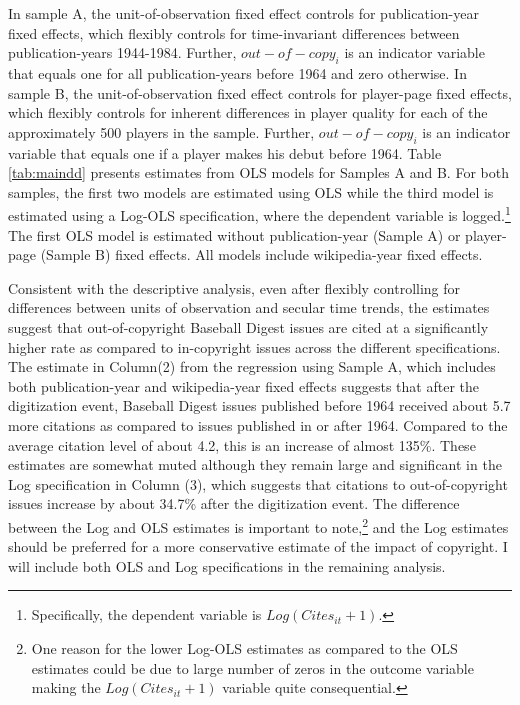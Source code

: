 \documentclass[11pt]{article}
\begin{document}
In sample A, the unit-of-observation fixed effect controls for publication-year fixed effects, which flexibly controls for time-invariant differences between publication-years 1944-1984. Further, $out-of-copy_i$ is an indicator variable that equals one for all publication-years before 1964 and zero otherwise. In sample B, the unit-of-observation fixed effect controls for player-page fixed effects, which flexibly controls  for inherent differences in player quality for each of the approximately 500 players in the sample. Further, $out-of-copy_i$ is an indicator variable that equals one if a player makes his debut before 1964. Table \ref{tab:maindd} presents estimates from OLS models for Samples A and B. For both samples, the first two models are estimated using OLS while the third model is estimated using a Log-OLS specification, where the dependent variable is logged.\footnote{Specifically, the dependent variable is $Log(Cites_{it}+1)$.} The first OLS model is estimated without publication-year (Sample A) or player-page (Sample B) fixed effects. All models include wikipedia-year fixed effects.

Consistent with the descriptive analysis, even after flexibly controlling for differences between units of observation and secular time trends, the estimates suggest that out-of-copyright Baseball Digest issues are cited at a significantly higher rate as compared to in-copyright issues across the different specifications. The estimate in Column(2) from the regression using Sample A, which includes both publication-year and wikipedia-year fixed effects suggests that after the digitization event, Baseball Digest issues published before 1964 received about 5.7 more citations as compared to issues published in or after 1964. Compared to the average citation level of about 4.2, this is an increase of almost 135\%. These estimates are somewhat muted although they remain large and significant in the Log specification in Column (3), which suggests that citations to out-of-copyright issues increase by about 34.7\% after the digitization event. The difference between the Log and OLS estimates is important to note,\footnote{One reason for the lower Log-OLS estimates as compared to the OLS estimates could be due to large number of zeros in the outcome variable making the $Log(Cites_{it}+1)$ variable quite consequential.} and the Log estimates should be preferred for a more conservative estimate of the impact of copyright. I will include both OLS and Log specifications in the remaining analysis. 
\end{document}
